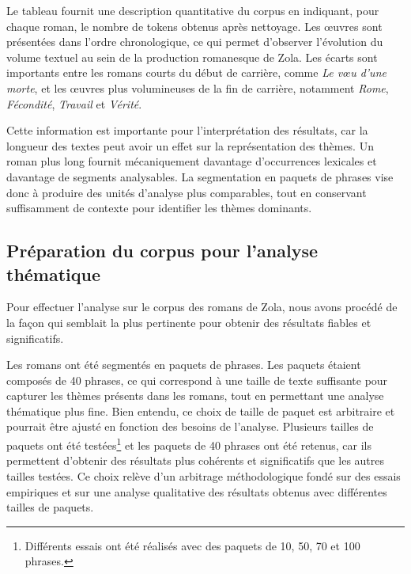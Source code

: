 \documentclass{article}
\begin{document}
Le tableau fournit une description quantitative du corpus en indiquant, pour chaque roman, le nombre de tokens obtenus après nettoyage. Les œuvres sont présentées dans l'ordre chronologique, ce qui permet d'observer l'évolution du volume textuel au sein de la production romanesque de Zola. Les écarts sont importants entre les romans courts du début de carrière, comme \textit{Le vœu d'une morte}, et les œuvres plus volumineuses de la fin de carrière, notamment \textit{Rome}, \textit{Fécondité}, \textit{Travail} et \textit{Vérité}.

Cette information est importante pour l'interprétation des résultats, car la longueur des textes peut avoir un effet sur la représentation des thèmes. Un roman plus long fournit mécaniquement davantage d'occurrences lexicales et davantage de segments analysables. La segmentation en paquets de phrases vise donc à produire des unités d'analyse plus comparables, tout en conservant suffisamment de contexte pour identifier les thèmes dominants.
\subsection{Préparation du corpus pour l'analyse thématique}

Pour effectuer l'analyse sur le corpus des romans de Zola, nous avons procédé de la façon qui semblait la plus pertinente pour obtenir des résultats fiables et significatifs. 

Les romans ont été segmentés en paquets de phrases. Les paquets étaient composés de 40 phrases, ce qui correspond à une taille de texte suffisante pour capturer les thèmes présents dans les romans, tout en permettant une analyse thématique plus fine. Bien entendu, ce choix de taille de paquet est arbitraire et pourrait être ajusté en fonction des besoins de l'analyse. Plusieurs tailles de paquets ont été testées\footnote{Différents essais ont été réalisés avec des paquets de 10, 50, 70 et 100 phrases.} et les paquets de 40 phrases ont été retenus, car ils permettent d'obtenir des résultats plus cohérents et significatifs que les autres tailles testées. Ce choix relève d'un arbitrage méthodologique fondé sur des essais empiriques et sur une analyse qualitative des résultats obtenus avec différentes tailles de paquets.
\end{document}
